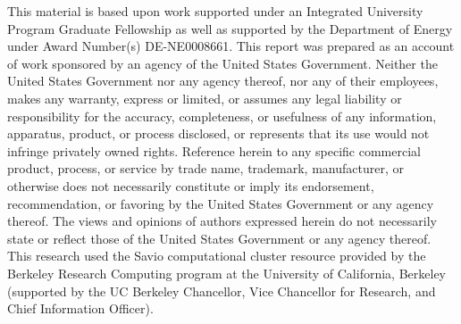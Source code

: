 \documentclass{article} %
\begin{document}
This material is based upon work supported under an Integrated
University Program Graduate Fellowship as well as supported by the Department 
of Energy under Award Number(s) DE-NE0008661. This report was prepared as an
account of work sponsored by an agency of the United States Government.
Neither the United States Government nor any agency thereof, nor any of their
employees, makes any warranty, express or limited, or assumes any legal
liability or responsibility for the accuracy, completeness, or usefulness of
any information, apparatus, product, or process disclosed, or represents that
its use would not infringe privately owned rights. Reference herein to any 
specific commercial product, process, or service by trade name, trademark, 
manufacturer, or otherwise does not necessarily constitute or imply its 
endorsement, recommendation, or favoring by the United States Government or
any agency thereof. The views and opinions of authors expressed herein do not 
necessarily state or reflect those of the United States Government or any 
agency thereof. This research used the Savio computational cluster resource 
provided by the Berkeley Research Computing program at the University of 
California, Berkeley (supported by the UC Berkeley Chancellor, Vice Chancellor
for Research, and Chief Information Officer).

\pagebreak



\end{document}
